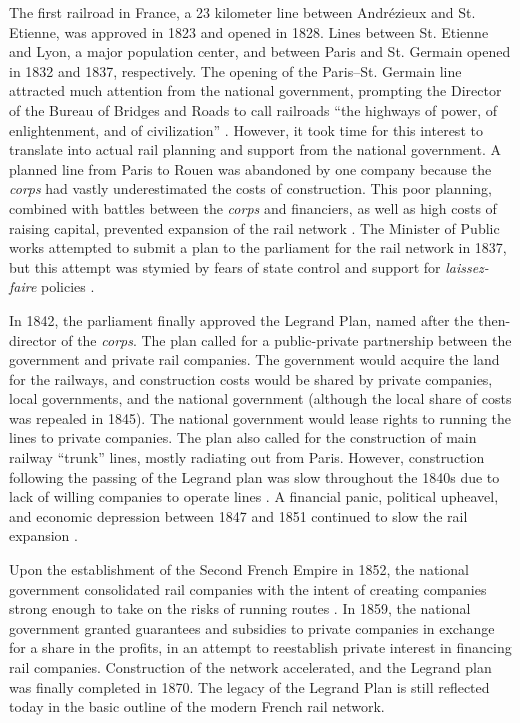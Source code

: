 \documentclass[12pt,twoside]{article}
\begin{document}
The first railroad in France, a 23 kilometer line between Andr\'{e}zieux and St. Etienne, was approved in 1823 and opened in 1828.
Lines between St. Etienne and Lyon, a major population center, and between Paris and St. Germain opened in 1832 and 1837, respectively.
The opening of the Paris--St. Germain line attracted much attention from the national government, prompting the Director of the Bureau of Bridges and Roads to call railroads ``the highways of power, of enlightenment, and of civilization'' \citep{doukas}.
However, it took time for this interest to translate into actual rail planning and support from the national government.
A planned line from Paris to Rouen was abandoned by one company because the \emph{corps} had vastly underestimated the costs of construction.
This poor planning, combined with battles between the \emph{corps} and financiers, as well as high costs of raising capital, prevented expansion of the rail network \citep{dunham}.
The Minister of Public works attempted to submit a plan to the parliament for the rail network in 1837, but this attempt was stymied by fears of state control and support for \emph{laissez-faire} policies \citep{clapham}.

In 1842, the parliament finally approved the Legrand Plan, named after the then-director of the \emph{corps}.
The plan called for a public-private partnership between the government and private rail companies.
The government would acquire the land for the railways, and construction costs would be shared by private companies, local governments, and the national government (although the local share of costs was repealed in 1845).
The national government would lease rights to running the lines to private companies.
The plan also called for the construction of main railway ``trunk'' lines, mostly radiating out from Paris.
However, construction following the passing of the Legrand plan was slow throughout the 1840s due to lack of willing companies to operate lines \citep{clapham}.
A financial panic, political upheavel, and economic depression between 1847 and 1851 continued to slow the rail expansion \citep{doukas}.

Upon the establishment of the Second French Empire in 1852, the national government consolidated rail companies with the intent of creating companies strong enough to take on the risks of running routes \citep{clapham}.
In 1859, the national government granted guarantees and subsidies to private companies in exchange for a share in the profits, in an attempt to reestablish private interest in financing rail companies.
Construction of the network accelerated, and the Legrand plan was finally completed in 1870.
The legacy of the Legrand Plan is still reflected today in the basic outline of the modern French rail network.
\end{document}
